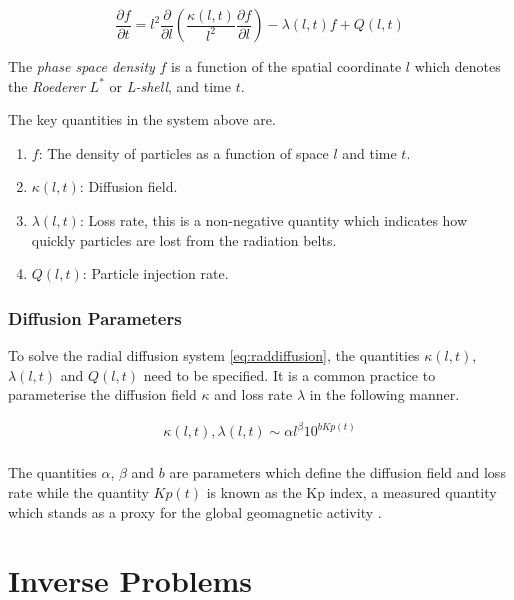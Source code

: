 \begin{equation}\label{eq:raddiffusion}
  \frac{\partial{f}}{\partial{t}} = l^2 \frac{\partial}{\partial{l}}\left( \frac{\kappa(l,
      t)}{l^{2}} \frac{\partial{f}}{\partial{l}} \right) - \lambda(l,
  t) f +  Q(l, t)
\end{equation}

The \emph{phase space density} $f$ is a function of the spatial
coordinate $l$ which denotes the \emph{Roederer} $L^*$ or
\emph{L-shell}, and time $t$.

The key quantities in the system above are.

\begin{enumerate}
\item $f$: The density of particles as a function of space $l$ and
  time $t$.
\item $\kappa(l, t)$: Diffusion field.
\item $\lambda(l, t)$: Loss rate, this is a non-negative
  quantity which indicates how quickly particles are lost from the
  radiation belts.
\item $Q(l, t)$: Particle injection rate.
\end{enumerate}

\subsubsection*{Diffusion Parameters}

To solve the radial diffusion system \ref{eq:raddiffusion}, the
quantities $\kappa(l, t)$, $\lambda(l, t)$ and $Q(l, t)$ need to be
specified. It is a common practice \citetext{see \citealp{GRL:GRL10762},
\citealp{JGRA:JGRA15067}, \citealp{JGRA:JGRA18021} and
\citealp{GRL:GRL22815}} to parameterise the diffusion field
$\kappa$ and loss rate $\lambda$ in the following manner.

\begin{align}
  \kappa(l,t), \lambda(l, t) \sim \alpha l^{\beta} 10^{b Kp(t)} \\
\end{align}

The quantities $\alpha$, $\beta$ and $b$ are parameters which define
the diffusion field and loss rate while the quantity $Kp(t)$ is known
as the Kp index, a measured quantity which stands as a proxy for the
global geomagnetic activity \citep{BartelsKp}.


\section{Inverse Problems}\label{sec:inv}

